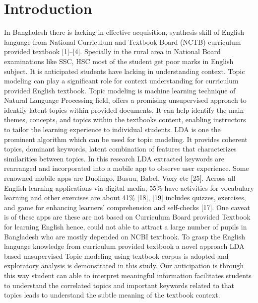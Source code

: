 \documentclass[sn-mathphys,Numbered]{sn-jnl}%
\theoremstyle{thmstyleone}%
\theoremstyle{thmstyletwo}%
\theoremstyle{thmstylethree}%
\begin{document}
\section{Introduction}\label{sec1}
In Bangladesh there is lacking in effective acquisition, synthesis skill of English language from National Curriculum and Textbook Board (NCTB) curriculum provided textbook {[}1{]}--{[}4{]}. Specially in the rural area in National Board examinations like SSC, HSC most of the student get poor marks in English subject. It is anticipated students have lacking in understanding context. Topic modeling can play a significant role for context understanding for curriculum provided English textbook. Topic modeling is machine learning technique of Natural Language Processing field, offers a promising unsupervised approach to identify latent topics within provided documents. It can help identify the main themes, concepts, and topics within the textbook\textquotesingle s content, enabling instructors to tailor the learning experience to individual students. LDA is one the prominent algorithm which can be used for topic modeling. It provides coherent topics, dominant keywords, latent combination of features that characterizes similarities between topics. In this research LDA extracted keywords are rearranged and incorporated into a mobile app to observe user experience. Some renowned mobile apps are Duolingo, Busuu, Babel, Voxy etc {[}25{]}. Across all English learning applications via digital media, 55\% have activities for vocabulary learning and other exercises are about 41\% {[}18{]}, {[}19{]} includes quizzes, exercises, and game for enhancing learners' comprehension and self-checks {[}17{]}. One caveat is of these apps are these are not based on Curriculum Board provided Textbook for learning English hence, could not able to attract a large number of pupils in Bangladesh who are mostly depended on NCBI textbook.  To grasp the English language knowledge from curriculum provided textbook a novel approach LDA based unsupervised Topic modeling using textbook corpus is adopted and exploratory analysis is demonstrated in this study. Our anticipation is through this way student can able to interpret meaningful information facilitates students to understand the correlated topics and important keywords related to that topics leads to understand the subtle meaning of the textbook context.
\end{document}
